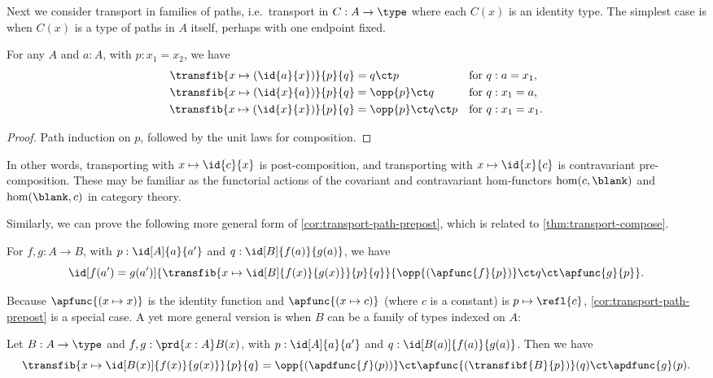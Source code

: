 %
Next we consider transport in families of paths, i.e.\ transport in $C:A\to\type$ where each $C(x)$ is an identity type.
The simplest case is when $C(x)$ is a type of paths in $A$ itself, perhaps with one endpoint fixed.

\begin{lem}\label{cor:transport-path-prepost}
  For any $A$ and $a:A$, with $p:x_1=x_2$, we have
  \begin{align*}
    \transfib{x \mapsto (\id{a}{x})} {p} {q} &= q \ct p
    & &\text{for $q:a=x_1$,}\\
    \transfib{x \mapsto (\id{x}{a})} {p} {q} &= \opp {p} \ct q
    & &\text{for $q:x_1=a$,}\\
    \transfib{x \mapsto (\id{x}{x})} {p} {q} &= \opp{p} \ct q \ct p
    & &\text{for $q:x_1=x_1$.}
  \end{align*}
\end{lem}
\begin{proof}
  Path induction on $p$, followed by the unit laws for composition.
\end{proof}

In other words, transporting with ${x \mapsto \id{c}{x}}$ is post-composition, and transporting with ${x \mapsto \id{x}{c}}$ is contravariant pre-composition.
These may be familiar as the functorial actions of the covariant and contravariant hom-functors $\hom(c, {\blank})$ and $\hom({\blank},c)$ in category theory.

Similarly, we can prove the following more general form of \cref{cor:transport-path-prepost}, which is related to \cref{thm:transport-compose}.

\begin{thm}\label{thm:transport-path}
  For $f,g:A\to B$, with $p : \id[A]{a}{a'}$ and $q : \id[B]{f(a)}{g(a)}$, we have
  \begin{equation*}
    \id[f(a') = g(a')]{\transfib{x \mapsto \id[B]{f(x)}{g(x)}}{p}{q}}
    {\opp{(\apfunc{f}{p})} \ct q \ct \apfunc{g}{p}}.
  \end{equation*}
\end{thm}

Because $\apfunc{(x \mapsto x)}$ is the identity function and $\apfunc{(x \mapsto c)}$ (where $c$ is a constant) is $p \mapsto\refl{c}$, \cref{cor:transport-path-prepost} is a special case.
A yet more general version is when $B$ can be a family of types indexed on $A$:

\begin{thm}\label{thm:transport-path2}
  Let $B : A \to \type$ and $f,g : \prd{x:A} B(x)$, with $p : \id[A]{a}{a'}$ and $q : \id[B(a)]{f(a)}{g(a)}$.
  Then we have
  \begin{equation*}
    \transfib{x \mapsto \id[B(x)]{f(x)}{g(x)}}{p}{q} =
    \opp{(\apdfunc{f}(p))} \ct \apfunc{(\transfibf{B}{p})}(q) \ct \apdfunc{g}(p).
  \end{equation*}
\end{thm}

